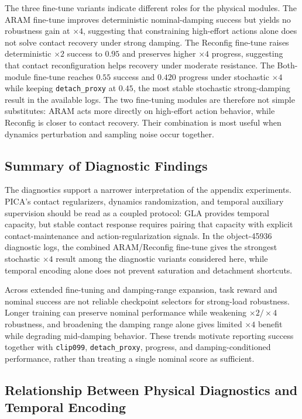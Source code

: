 \documentclass{llmxive}
\begin{document}
The three fine-tune variants indicate different roles for the physical
modules. The ARAM fine-tune improves deterministic nominal-damping
success but yields no robustness gain at $\times4$, suggesting that
constraining high-effort actions alone does not solve contact
recovery under strong damping. The Reconfig fine-tune raises
deterministic $\times2$ success to $0.95$ and preserves higher $\times4$
progress, suggesting that contact reconfiguration helps recovery
under moderate resistance. The Both-module fine-tune reaches $0.55$
success and $0.420$ progress under stochastic $\times4$ while keeping
\texttt{detach\_proxy} at $0.45$, the most stable stochastic
strong-damping result in the available logs. The two fine-tuning
modules are therefore not simple substitutes: ARAM acts more
directly on high-effort action behavior, while Reconfig is closer to
contact recovery. Their combination is most useful when dynamics
perturbation and sampling noise occur together.



\subsection{Summary of Diagnostic Findings}
\label{sec:findings}

The diagnostics support a narrower interpretation of the appendix
experiments. PICA's contact regularizers, dynamics randomization, and
temporal auxiliary supervision should be read as a coupled protocol:
GLA provides temporal capacity, but stable contact response requires
pairing that capacity with explicit contact-maintenance and
action-regularization signals. In the object-45936 diagnostic logs,
the combined ARAM/Reconfig fine-tune gives the strongest stochastic
$\times4$ result among the diagnostic variants considered here, while
temporal encoding alone does not prevent saturation and detachment
shortcuts.

Across extended fine-tuning and damping-range expansion, task reward
and nominal success are not reliable checkpoint selectors for
strong-load robustness. Longer training can preserve nominal
performance while weakening $\times2/\times4$ robustness, and
broadening the damping range alone gives limited $\times4$ benefit
while degrading mid-damping behavior. These trends motivate reporting
success together with \texttt{clip099}, \texttt{detach\_proxy},
progress, and damping-conditioned performance, rather than treating a
single nominal score as sufficient.


\subsection{Relationship Between Physical Diagnostics and Temporal
Encoding}
\label{sec:phys-temp}
\end{document}

